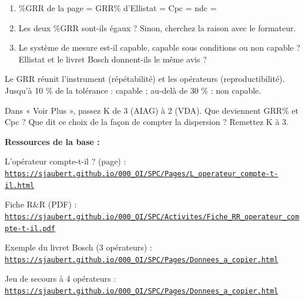 \documentclass[10pt,a4paper]{article}
\begin{document}
\begin{enumerate}[label=\textcolor{cyan}{\textbf{Q\arabic*.}},leftmargin=22pt]
\item \%GRR de la page = \champ{14mm} \quad GRR\% d'Ellistat = \champ{14mm} \quad Cpc = \champ{10mm} \quad ndc = \champ{10mm}\par\vspace{5pt}
\item Les deux \%GRR sont-ils égaux ? Sinon, cherchez la raison avec le formateur.\reponse[2]
\item Le système de mesure est-il capable, capable sous conditions ou non capable ? Ellistat et le livret Bosch donnent-ils le même avis ?\reponse[1]
\end{enumerate}
\begin{tcolorbox}[retenir]Le GRR réunit l'instrument (répétabilité) et les opérateurs (reproductibilité). Jusqu'à 10 \% de la tolérance : capable ; au-delà de 30 \% : non capable.\end{tcolorbox}
\begin{tcolorbox}[plus]Dans « Voir Plus », passez K de 3 (AIAG) à 2 (VDA). Que deviennent GRR\% et Cpc ? Que dit ce choix de la façon de compter la dispersion ? Remettez K à 3.\end{tcolorbox}
\vfill{\footnotesize\color{uimm}\textbf{Ressources de la base :}\par L'opérateur compte-t-il ? (page) : \href{https://sjaubert.github.io/000_OI/SPC/Pages/L_operateur_compte-t-il.html}{\nolinkurl{https://sjaubert.github.io/000_OI/SPC/Pages/L_operateur_compte-t-il.html}}\par Fiche R\&R (PDF) : \href{https://sjaubert.github.io/000_OI/SPC/Activites/Fiche_RR_operateur_compte-t-il.pdf}{\nolinkurl{https://sjaubert.github.io/000_OI/SPC/Activites/Fiche_RR_operateur_compte-t-il.pdf}}\par Exemple du livret Bosch (3 opérateurs) : \href{https://sjaubert.github.io/000_OI/SPC/Pages/Donnees_a_copier.html\#rr}{\nolinkurl{https://sjaubert.github.io/000_OI/SPC/Pages/Donnees_a_copier.html}}\par Jeu de secours à 4 opérateurs : \href{https://sjaubert.github.io/000_OI/SPC/Pages/Donnees_a_copier.html\#rrbutees4}{\nolinkurl{https://sjaubert.github.io/000_OI/SPC/Pages/Donnees_a_copier.html}}}
\end{document}
